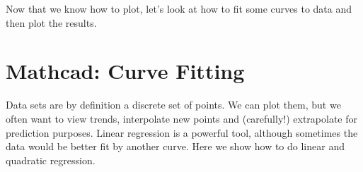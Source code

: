Now that we know how to plot, let's look at how to fit some curves to data and then plot the results.

\section{Mathcad: Curve Fitting}\label{sec:Mathcurvefitting}

Data sets are by definition a discrete set of points.  We can plot them, but we often want to view trends, interpolate new points and (carefully!) extrapolate for prediction purposes.  Linear regression is a powerful tool, although sometimes the data would be better fit by another curve.  Here we show how to do linear and quadratic regression.  \\

